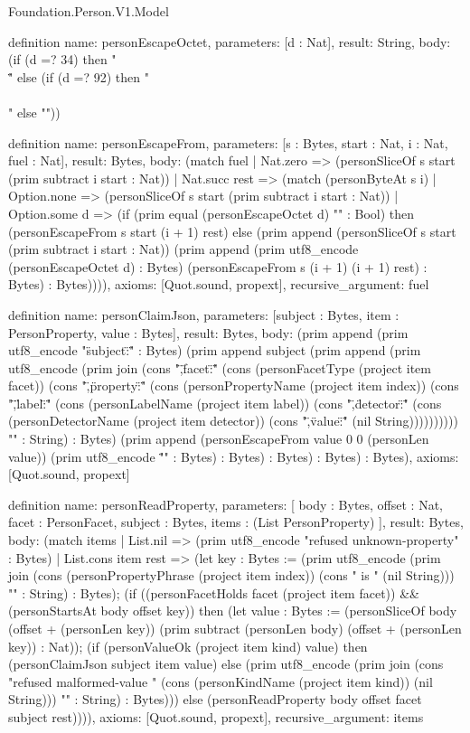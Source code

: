 \begin{lexlean}{Foundation.Person.V1.Model}
\begin{semanticmodule}
definition{
  name: personEscapeOctet,
  parameters: [d : Nat],
  result: String,
  body: (if (d =? 34) then "\\\"" else (if (d =? 92) then "\\\\" else ""))
}

definition{
  name: personEscapeFrom,
  parameters: [s : Bytes, start : Nat, i : Nat, fuel : Nat],
  result: Bytes,
  body: (match fuel
    | Nat.zero => (personSliceOf s start (prim subtract i start : Nat))
    | Nat.succ rest => (match (personByteAt s i)
      | Option.none => (personSliceOf s start (prim subtract i start : Nat))
      | Option.some d => (if (prim equal (personEscapeOctet d) "" : Bool) then (personEscapeFrom s start (i + 1) rest) else (prim append (personSliceOf s start (prim subtract i start : Nat)) (prim append (prim utf8_encode (personEscapeOctet d) : Bytes) (personEscapeFrom s (i + 1) (i + 1) rest) : Bytes) : Bytes)))),
  axioms: [Quot.sound, propext],
  recursive_argument: fuel
}

definition{
  name: personClaimJson,
  parameters: [subject : Bytes, item : PersonProperty, value : Bytes],
  result: Bytes,
  body: (prim append (prim utf8_encode "{\"subject\":\"" : Bytes) (prim append subject (prim append (prim utf8_encode (prim join (cons "\",\"facet\":\"" (cons (personFacetType (project item facet)) (cons "\",\"property\":\"" (cons (personPropertyName (project item index)) (cons "\",\"label\":\"" (cons (personLabelName (project item label)) (cons "\",\"detector\":\"" (cons (personDetectorName (project item detector)) (cons "\",\"value\":\"" (nil String)))))))))) "" : String) : Bytes) (prim append (personEscapeFrom value 0 0 (personLen value)) (prim utf8_encode "\"}" : Bytes) : Bytes) : Bytes) : Bytes) : Bytes),
  axioms: [Quot.sound, propext]
}

definition{
  name: personReadProperty,
  parameters: [
    body : Bytes,
    offset : Nat,
    facet : PersonFacet,
    subject : Bytes,
    items : (List PersonProperty)
  ],
  result: Bytes,
  body: (match items
    | List.nil => (prim utf8_encode "refused unknown-property" : Bytes)
    | List.cons item rest => (let key : Bytes := (prim utf8_encode (prim join (cons (personPropertyPhrase (project item index)) (cons " is " (nil String))) "" : String) : Bytes); (if ((personFacetHolds facet (project item facet)) && (personStartsAt body offset key)) then (let value : Bytes := (personSliceOf body (offset + (personLen key)) (prim subtract (personLen body) (offset + (personLen key)) : Nat)); (if (personValueOk (project item kind) value) then (personClaimJson subject item value) else (prim utf8_encode (prim join (cons "refused malformed-value " (cons (personKindName (project item kind)) (nil String))) "" : String) : Bytes))) else (personReadProperty body offset facet subject rest)))),
  axioms: [Quot.sound, propext],
  recursive_argument: items
}


\end{semanticmodule}
\end{lexlean}
